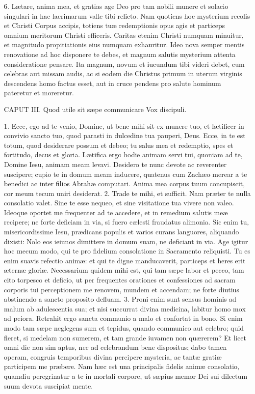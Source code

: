 6. Lætare, anima mea, et gratias age Deo pro tam nobili munere et solacio singulari in hac lacrimarum valle tibi relicto. Nam quotiens hoc mysterium recolis et Christi Corpus accipis, totiens tuæ redemptionis opus agis et particeps omnium meritorum Christi efficeris. Caritas etenim Christi numquam minuitur, et magnitudo propitiationis eius numquam exhauritur. Ideo nova semper mentis renovatione ad hoc disponere te debes, et magnum salutis mysterium attenta consideratione pensare. Ita magnum, novum et iucundum tibi videri debet, cum celebras aut missam audis, ac si eodem die Christus primum in uterum virginis descendens homo factus esset, aut in cruce pendens pro salute hominum pateretur et moreretur.


CAPUT III.
Quod utile sit sæpe communicare
Vox discipuli.

1. Ecce, ego ad te venio, Domine, ut bene mihi sit ex munere tuo, et lætificer in convivio sancto tuo, quod parasti in dulcedine tua pauperi, Deus. Ecce, in te est totum, quod desiderare possum et debeo; tu salus mea et redemptio, spes et fortitudo, decus et gloria. Lætifica ergo hodie animam servi tui, quoniam ad te, Domine Iesu, animam meam levavi. Desidero te nunc devote ac reverenter suscipere; cupio te in domum meam inducere, quatenus cum Zachæo merear a te benedici ac inter filios Abrahæ computari. Anima mea corpus tuum concupiscit, cor meum tecum uniri desiderat.
2. Trade te mihi, et sufficit. Nam præter te nulla consolatio valet. Sine te esse nequeo, et sine visitatione tua vivere non valeo. Ideoque oportet me frequenter ad te accedere, et in remedium salutis meæ recipere; ne forte deficiam in via, si fuero cælesti fraudatus alimonia. Sic enim tu, misericordissime Iesu, prædicans populis et varios curans languores, aliquando dixisti: Nolo eos ieiunos dimittere in domum suam, ne deficiant in via. Age igitur hoc mecum modo, qui te pro fidelium consolatione in Sacramento reliquisti. Tu es enim suavis refectio animæ: et qui te digne manducaverit, particeps et heres erit æternæ gloriæ. Necessarium quidem mihi est, qui tam sæpe labor et pecco, tam cito torpesco et deficio, ut per frequentes orationes et confessiones ad sacram corporis tui perceptionem me renovem, mundem et accendam; ne forte diutius abstinendo a sancto proposito defluam.
3. Proni enim sunt sensus hominis ad malum ab adulescentia sua; et nisi succurrat divina medicina, labitur homo mox ad peiora. Retrahit ergo sancta communio a malo et confortat in bono. Si enim modo tam sæpe neglegens sum et tepidus, quando communico aut celebro; quid fieret, si medelam non sumerem, et tam grande iuvamen non quærerem? Et licet omni die non sim aptus, nec ad celebrandum bene dispositus; dabo tamen operam, congruis temporibus divina percipere mysteria, ac tantæ gratiæ participem me præbere. Nam hæc est una principalis fidelis animæ consolatio, quamdiu peregrinatur a te in mortali corpore, ut sæpius memor Dei sui dilectum suum devota suscipiat mente.
